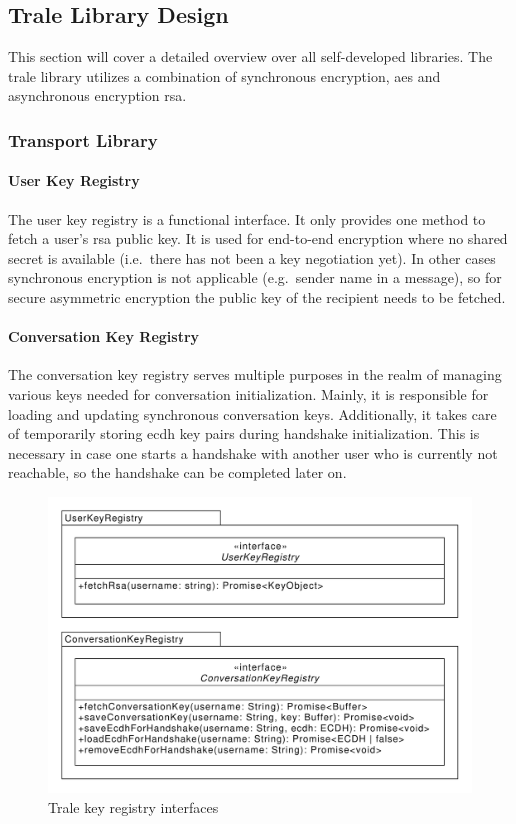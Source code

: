 \subsection{Trale Library Design}\label{subsec:trale-library-design}

This section will cover a detailed overview over all self-developed libraries.
The trale library utilizes a combination of synchronous encryption, \ac{aes} and asynchronous encryption \ac{rsa}.

\subsubsection{Transport Library}

\paragraph{User Key Registry}
The user key registry is a functional interface.
It only provides one method to fetch a user's \ac{rsa} public key.
It is used for end-to-end encryption where no shared secret is available (i.e.\ there has not been a key negotiation
yet).
In other cases synchronous encryption is not applicable (e.g.\ sender name in a message), so for secure asymmetric
encryption the public key of the recipient needs to be fetched.

\paragraph{Conversation Key Registry}
The conversation key registry serves multiple purposes in the realm of managing various keys needed for conversation
initialization.
Mainly, it is responsible for loading and updating synchronous conversation keys.
Additionally, it takes care of temporarily storing \ac{ecdh} key pairs during handshake initialization.
This is necessary in case one starts a handshake with another user who is currently not reachable, so the handshake can
be completed later on.

\begin{figure}[H]
    \centering
    \includegraphics[width=1.0\textwidth]{./graphics/classDiagramTransportLibraryDiverse}
    \vspace*{-0.5cm}
    \caption{Trale key registry interfaces}
    \label{fig:figure34}
\end{figure}

